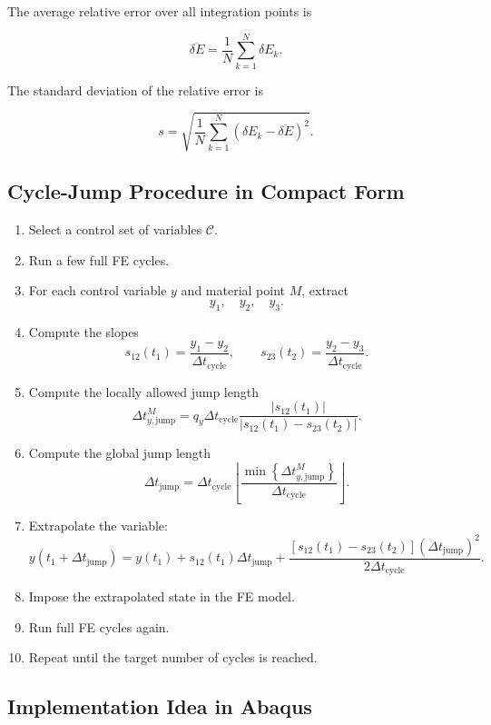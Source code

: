 ﻿\documentclass[11pt,a4paper]{article}
\begin{document}
The average relative error over all integration points is

\[
\overline{\delta E}
=
\frac{1}{N}
\sum_{k=1}^{N}
\delta E_k.
\]

The standard deviation of the relative error is

\[
s
=
\sqrt{
\frac{1}{N}
\sum_{k=1}^{N}
\left(
\delta E_k - \overline{\delta E}
\right)^2
}.
\]

\subsection{Cycle-Jump Procedure in Compact Form}

\begin{enumerate}[leftmargin=*]
    \item Select a control set of variables $\mathcal{C}$.
    \item Run a few full FE cycles.
    \item For each control variable $y$ and material point $M$, extract
    \[
    y_1,\quad y_2,\quad y_3.
    \]
    \item Compute the slopes
    \[
    s_{12}(t_1)
    =
    \frac{y_1-y_2}{\Delta t_{\mathrm{cycle}}},
    \qquad
    s_{23}(t_2)
    =
    \frac{y_2-y_3}{\Delta t_{\mathrm{cycle}}}.
    \]
    \item Compute the locally allowed jump length
    \[
    \Delta t^M_{y,\mathrm{jump}}
    =
    q_y \Delta t_{\mathrm{cycle}}
    \frac{
    |s_{12}(t_1)|
    }{
    |s_{12}(t_1)-s_{23}(t_2)|
    }.
    \]
    \item Compute the global jump length
    \[
    \Delta t_{\mathrm{jump}}
    =
    \Delta t_{\mathrm{cycle}}
    \left\lfloor
    \frac{
    \min\left\{\Delta t^M_{y,\mathrm{jump}}\right\}
    }{
    \Delta t_{\mathrm{cycle}}
    }
    \right\rfloor.
    \]
    \item Extrapolate the variable:
    \[
    y(t_1+\Delta t_{\mathrm{jump}})
    =
    y(t_1)
    +
    s_{12}(t_1)\Delta t_{\mathrm{jump}}
    +
    \frac{
    [s_{12}(t_1)-s_{23}(t_2)]
    (\Delta t_{\mathrm{jump}})^2
    }{
    2\Delta t_{\mathrm{cycle}}
    }.
    \]
    \item Impose the extrapolated state in the FE model.
    \item Run full FE cycles again.
    \item Repeat until the target number of cycles is reached.
\end{enumerate}

\subsection{Implementation Idea in Abaqus}
\end{document}
